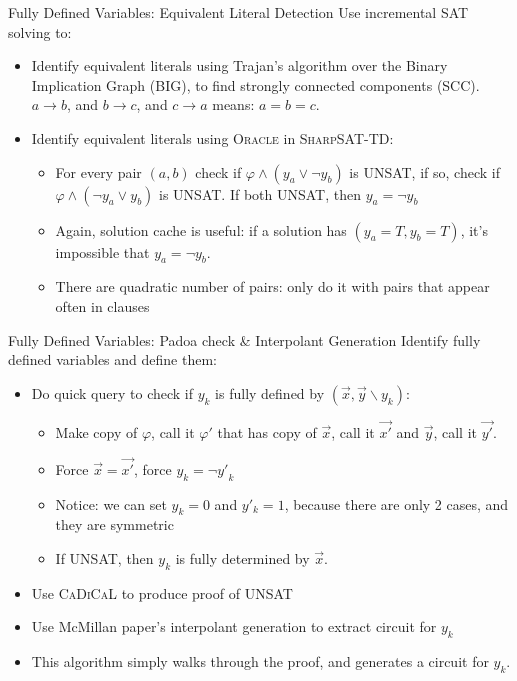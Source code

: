 \documentclass[aspectratio=169]{beamer}
\begin{document}
\begin{frame}{Fully Defined Variables: Equivalent Literal Detection}
Use incremental SAT solving to:
\begin{itemize}
    \item Identify equivalent literals using Trajan's algorithm over the
        Binary Implication Graph (BIG), to find strongly connected components (SCC).
        $a\rightarrow b$, and $b\rightarrow c$, and $c\rightarrow a$ means:
        $a = b = c$.
    \item Identify equivalent literals using \textsc{Oracle}
        in \textsc{SharpSAT-TD}:
        \begin{itemize}
            \item For every pair $(a,b)$ check if $\varphi \land (y_a \lor \neg
                y_b)$ is UNSAT, if so, check if $\varphi \land (\neg y_a \lor
                y_b)$ is UNSAT. If both UNSAT, then $y_a = \neg y_b$
            \item Again, solution cache is useful: if a solution has $(y_a = T,
                y_b = T)$, it's impossible that $y_a = \neg y_b$.
            \item There are quadratic number of pairs: only do it with pairs that
                appear often in clauses
        \end{itemize}
\end{itemize}
\end{frame}

\begin{frame}{Fully Defined Variables: Padoa check \& Interpolant Generation}
Identify fully defined variables and define them:
\begin{itemize}
    \item Do quick query to check if $y_k$ is fully defined by $(\vec{x},
        \vec{y} \backslash y_k)$:
        \begin{itemize}
        \item Make copy of $\varphi$, call it $\varphi'$ that has copy of
            $\vec{x}$, call it $\vec{x'}$ and $\vec{y}$, call it $\vec{y'}$.
        \item Force $\vec{x} = \vec{x'}$, force $y_k = \neg {y'}_k$
        \item Notice: we can set $y_k=0$ and $y'_k=1$, because
            there are only 2 cases, and they are symmetric
        \item If UNSAT, then $y_k$ is fully determined by $\vec{x}$.
        \end{itemize}
    \item Use \textsc{CaDiCaL} to produce proof of UNSAT
    \item Use McMillan paper's interpolant generation to extract circuit for
        $y_k$
    \item This algorithm simply walks through the proof,
        and generates a circuit for $y_k$.
\end{itemize}
\end{frame}
\end{document}
